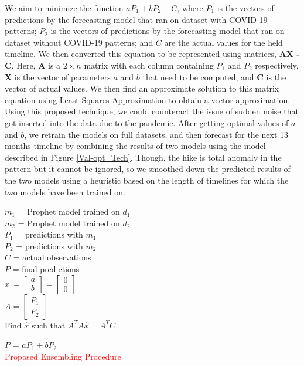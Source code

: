 \documentclass[times,twocolumn,final,authoryear]{elsarticle}
\begin{document}
	We aim to minimize the function \(aP_{1} + bP_{2} - C\), where \(P_{1}\) is the vectors of predictions by the forecasting model that ran on dataset with COVID-19 patterns; \(P_{2}\) is the vectors of predictions by the forecasting model that ran on dataset without COVID-19 patterns; and \(C\) are the actual values for the held timeline. We then converted this equation to be represented using matrices, \textbf{AX - C}. Here, \textbf{A} is a \(2\times n\) matrix with each column containing \(P_{1}\) and \(P_{2}\) respectively, \textbf{X} is the vector of parameters \(a\) and \(b\) that need to be computed, and \textbf{C} is the vector of actual values. We then find an approximate solution to this matrix equation using Least Squares Approximation to obtain a vector approximation. Using this proposed technique, we could counteract the issue of sudden noise that got inserted into the data due to the pandemic. After getting optimal values of \(a\) and \(b\), we retrain the models on full datasets, and then forecast for the next 13 months timeline by combining the results of two models using the model described in Figure \ref{Val-opt_Tech}. Though, the hike is total anomaly in the pattern but it cannot be ignored, so we smoothed down the predicted results of the two models using a heuristic based on the length of timelines for which the two models have been trained on.
	
	\begin{algorithm}
		\(m_1\) = Prophet model trained on \(d_1\)\\
		\(m_2\) = Prophet model trained on \(d_2\)\\
		
		\(P_1\) = predictions with \(m_1\)\\
		\(P_2\) = predictions with \(m_2\)\\
		\(C\) = actual observations\\
		\(P\) = final predictions\\
		
		\(\widehat{x}\ = \begin{bmatrix}
			a\\ 
			b
		\end{bmatrix} = \begin{bmatrix}
			0\\ 
			0
		\end{bmatrix} \)\\

		\(A = \begin{bmatrix}
			P_1\\ 
			P_2
		\end{bmatrix}\)\\
		Find \(\widehat{x}\) such that{
			\(A^{T}A\widehat{x}  =  A^{T}C\)
		}
	
		\(P\) = \(a P_{1} + b P_{2}\)\\
		\caption{\textcolor{red}{Proposed Ensembling Procedure}}
	\end{algorithm}
	
\end{document}
